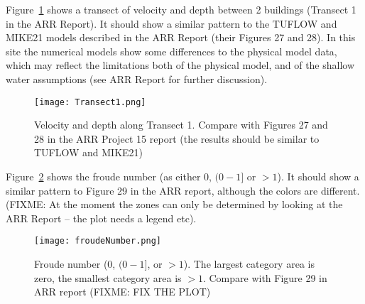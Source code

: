 \documentclass{article}
\begin{document}
Figure~\ref{fig:transect1} shows a transect of velocity and depth between 2 buildings (Transect
1 in the ARR Report).  It should show a similar pattern to the TUFLOW and
MIKE21 models described in the ARR Report (their Figures 27 and 28).  In this
site the numerical models show some differences to the physical model data,
which may reflect the limitations both of the physical model, and of the
shallow water assumptions (see ARR Report for further discussion).
\begin{figure}
\texttt{[image: Transect1.png]}
\caption{Velocity and depth along Transect 1. Compare with Figures 27 and 28 
in the ARR Project 15 report (the results should be similar to TUFLOW and
MIKE21)}
\label{fig:transect1}
\end{figure}

Figure~\ref{fig:froude} shows the froude number (as either 0, $(0-1]$ or $>1$).  It
should show a similar pattern to Figure 29 in the ARR report, although the
colors are different. (FIXME: At the moment the zones can only be determined by
looking at the ARR Report -- the plot needs a legend etc).
\begin{figure}
\center
\texttt{[image: froudeNumber.png]}
\caption{Froude number (0, $(0-1]$, or $>1$). The largest category area is zero, the smallest category area is $>1$. Compare with Figure 29 in ARR report (FIXME: FIX THE PLOT)}
\label{fig:froude}
\end{figure}
\end{document}
